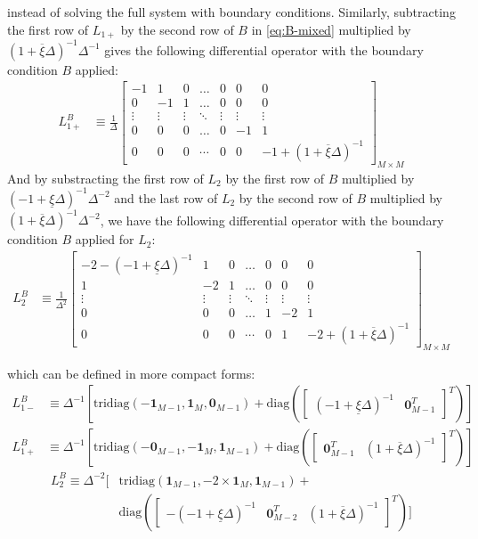 \documentclass[11pt]{article}
\newcommand{\diag}{\ensuremath{\mathrm{diag}}}
\theoremstyle{definition}
\begin{document}
instead of solving the full system with boundary conditions. Similarly, subtracting the first row of $L_{1+}$ by the second row of $B$ in \eqref{eq:B-mixed} multiplied by $(1 + \overline{\xi} \Delta )^{-1} \Delta^{-1}$ gives the following differential operator with the boundary condition $B$ applied:
\begin{align}
L_{1+}^B &\equiv \frac{1}{\Delta}\begin{bmatrix}
-1&1&0&\dots&0&0&0\\
0&-1&1&\dots&0&0&0\\
\vdots&\vdots&\vdots&\ddots&\vdots&\vdots&\vdots\\
0&0&0&\dots&0&-1&1\\
0&0&0&\cdots&0&0&-1+(1+\overline{\xi} \Delta)^{-1}
\end{bmatrix}_{M\times M}\label{eq:L-1-plus-regular}
\end{align}
And by substracting the first row of $L_2$ by the first row of $B$ multiplied by $(-1 + \underline{\xi} \Delta )^{-1} \Delta^{-2}$ and the last row of $L_2$ by the second row of $B$ multiplied by $(1 + \overline{\xi} \Delta)^{-1} \Delta^{-2}$, we have the following differential operator with the boundary condition $B$ applied for $L_2$:
\begin{align}
L_2^B &\equiv \frac{1}{\Delta^2}\begin{bmatrix}
-2 - (-1 + \underline{\xi}\Delta)^{-1} &1&0&\dots&0&0&0\\
1&-2&1&\dots&0&0&0\\
\vdots&\vdots&\vdots&\ddots&\vdots&\vdots&\vdots\\
0&0&0&\dots&1&-2&1\\
0&0&0&\cdots&0&1&-2 +(1+ \overline{\xi}\Delta)^{-1}
\end{bmatrix}_{M\times M}\label{eq:L-2-regular}
\end{align}

which can be defined in more compact forms:
\begin{align}
L_{1-}^B &\equiv \Delta^{-1}
\left[ 
\text{tridiag}(-\mathbf{1}_{M-1}, 
\mathbf{1}_{M}, \mathbf{0}_{M-1} ) + \diag \left( \begin{bmatrix}
(-1+\underline{\xi} \Delta)^{-1} &
\mathbf{0}_{M-1}^T 
\end{bmatrix}^T
\right)
\right]
\end{align}
\begin{align}
L_{1+}^B &\equiv 
\Delta^{-1}
\left[ 
\text{tridiag}(-\mathbf{0}_{M-1}, 
\mathbf{-1}_{M}, \mathbf{1}_{M-1} ) + \diag \left( \begin{bmatrix}
\mathbf{0}_{M-1}^T &
(1+\overline{\xi} \Delta)^{-1}
\end{bmatrix}^T
\right)
\right]
\end{align}
\begin{align}
L_2^B \equiv  \Delta^{-2} 
\Big[ 
&\text{tridiag}(
\mathbf{1}_{M-1},
-2 \times \mathbf{1}_M,
\mathbf{1}_{M-1} )
+ \\
&\diag \left( \begin{bmatrix}
-(-1+\underline{\xi} \Delta)^{-1}&
\mathbf{0}_{M-2}^T &
(1+\overline{\xi} \Delta)^{-1}
\end{bmatrix}^T \right)
\Big]
\end{align}
\end{document}
